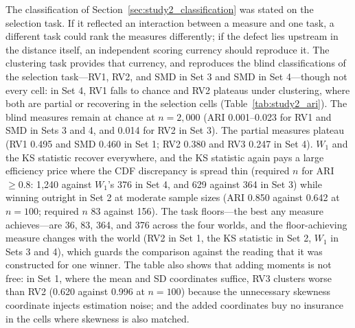 \documentclass[AMA,Times1COL]{WileyNJDv5}
\begin{document}
The classification of Section~\ref{sec:study2_classification} was stated on the selection task. If it reflected an interaction between a measure and one task, a different task could rank the measures differently; if the defect lies upstream in the distance itself, an independent scoring currency should reproduce it. The clustering task provides that currency, and reproduces the blind classifications of the selection task---RV1, RV2, and SMD in Set 3 and SMD in Set 4---though not every cell: in Set 4, RV1 falls to chance and RV2 plateaus under clustering, where both are partial or recovering in the selection cells (Table~\ref{tab:study2_ari}). The blind measures remain at chance at $n = 2{,}000$ (ARI 0.001--0.023 for RV1 and SMD in Sets 3 and 4, and 0.014 for RV2 in Set 3). The partial measures plateau (RV1 0.495 and SMD 0.460 in Set 1; RV2 0.380 and RV3 0.247 in Set 4). $W_1$ and the KS statistic recover everywhere, and the KS statistic again pays a large efficiency price where the CDF discrepancy is spread thin (required $n$ for ARI $\geq 0.8$: 1{,}240 against $W_1$'s 376 in Set 4, and 629 against 364 in Set 3) while winning outright in Set 2 at moderate sample sizes (ARI 0.850 against 0.642 at $n = 100$; required $n$ 83 against 156). The task floors---the best any measure achieves---are 36, 83, 364, and 376 across the four worlds, and the floor-achieving measure changes with the world (RV2 in Set 1, the KS statistic in Set 2, $W_1$ in Sets 3 and 4), which guards the comparison against the reading that it was constructed for one winner. The table also shows that adding moments is not free: in Set 1, where the mean and SD coordinates suffice, RV3 clusters worse than RV2 (0.620 against 0.996 at $n = 100$) because the unnecessary skewness coordinate injects estimation noise; and the added coordinates buy no insurance in the cells where skewness is also matched.
\end{document}
